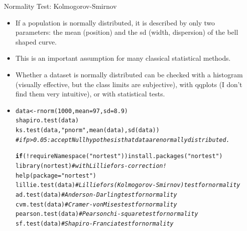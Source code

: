 \documentclass[xcolor=table,       handout,    xcolor=dvipsnames]{beamer}\usepackage[]{graphicx}\usepackage[]{color}
\makeatletter
\newcommand{\hlnum}[1]{\textcolor[rgb]{0,0,0}{#1}}
\newcommand{\hlstr}[1]{\textcolor[rgb]{0.545,0.137,0.137}{#1}}
\newcommand{\hlcom}[1]{\textcolor[rgb]{0,0.392,0}{\textit{#1}}}
\newcommand{\hlopt}[1]{\textcolor[rgb]{0,0,0}{#1}}
\newcommand{\hlstd}[1]{\textcolor[rgb]{0,0,0}{#1}}
\newcommand{\hlkwa}[1]{\textcolor[rgb]{1,0,0}{\textbf{#1}}}
\newcommand{\hlkwb}[1]{\textcolor[rgb]{0,0,0}{#1}}
\newcommand{\hlkwc}[1]{\textcolor[rgb]{1,0,1}{#1}}
\newcommand{\hlkwd}[1]{\textcolor[rgb]{0,0,1}{#1}}
\newenvironment{kframe}{%
 \def\at@end@of@kframe{}%
 \ifinner\ifhmode%
  \def\at@end@of@kframe{\end{minipage}}%
  \begin{minipage}{\columnwidth}%
 \fi\fi%
 \def\FrameCommand##1{\hskip\@totalleftmargin \hskip-\fboxsep
 \colorbox{shadecolor}{##1}\hskip-\fboxsep
     \hskip-\linewidth \hskip-\@totalleftmargin \hskip\columnwidth}%
 \MakeFramed {\advance\hsize-\width
   \@totalleftmargin\z@ \linewidth\hsize
   \@setminipage}}%
 {\par\unskip\endMakeFramed%
 \at@end@of@kframe}
\newenvironment{knitrout}{}{} %
\makeatother
\begin{document}
\begin{frame}[fragile]{Normality Test: Kolmogorov-Smirnov}
\pause
\begin{itemize}[<+->]
  \item If a population is normally distributed, it is described by only two parameters: the mean (position) and the sd (width, dispersion) of the bell shaped curve.
  \item This is an important assumption for many classical statistical methods.
  \item Whether a dataset is normally distributed can be checked with a histogram (visually effective, but the class limits are subjective), with qqplots (I don't find them very intuitive), or with statistical tests.
\item  \tiny
\begin{knitrout}
\color{fgcolor}\begin{kframe}
\begin{alltt}
\hlstd{data} \hlkwb{<-} \hlkwd{rnorm}\hlstd{(}\hlnum{1000}\hlstd{,} \hlkwc{mean}\hlstd{=}\hlnum{97}\hlstd{,} \hlkwc{sd}\hlstd{=}\hlnum{8.9}\hlstd{)}
\hlkwd{shapiro.test}\hlstd{(data)}
\hlkwd{ks.test}\hlstd{(data,} \hlstr{"pnorm"}\hlstd{,} \hlkwd{mean}\hlstd{(data),} \hlkwd{sd}\hlstd{(data))}
\hlcom{# if p > 0.05: accept Nullhypothesis that data are normally distributed.}

\hlkwa{if}\hlstd{(}\hlopt{!}\hlkwd{requireNamespace}\hlstd{(}\hlstr{"nortest"}\hlstd{))} \hlkwd{install.packages}\hlstd{(}\hlstr{"nortest"}\hlstd{)}
\hlkwd{library}\hlstd{(nortest)}          \hlcom{# with Lilliefors-correction!}
\hlkwd{help}\hlstd{(}\hlkwc{package}\hlstd{=}\hlstr{"nortest"}\hlstd{)}
\hlkwd{lillie.test}\hlstd{(data)}  \hlcom{# Lilliefors (Kolmogorov-Smirnov) test for normality}
\hlkwd{ad.test}\hlstd{(data)}      \hlcom{# Anderson-Darling test for normality}
\hlkwd{cvm.test}\hlstd{(data)}     \hlcom{# Cramer-von Mises test for normality}
\hlkwd{pearson.test}\hlstd{(data)} \hlcom{# Pearson chi-square test for normality}
\hlkwd{sf.test}\hlstd{(data)}      \hlcom{# Shapiro-Francia test for normality}
\end{alltt}
\end{kframe}
\end{knitrout}
\end{itemize}
\label{nortest}
\end{frame}

\end{document}
